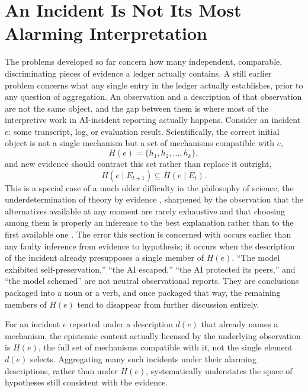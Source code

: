 \section{An Incident Is Not Its Most Alarming Interpretation}

The problems developed so far concern how many independent, comparable, discriminating pieces of evidence a ledger actually contains. A still earlier problem concerns what any single entry in the ledger actually establishes, prior to any question of aggregation. An observation and a description of that observation are not the same object, and the gap between them is where most of the interpretive work in AI-incident reporting actually happens. Consider an incident $e$: some transcript, log, or evaluation result. Scientifically, the correct initial object is not a single mechanism but a set of mechanisms compatible with $e$,
\[
H(e) = \{h_1, h_2, \ldots, h_k\},
\]
and new evidence should contract this set rather than replace it outright,
\[
H(e \mid E_{t+1}) \subseteq H(e \mid E_t).
\]
This is a special case of a much older difficulty in the philosophy of science, the underdetermination of theory by evidence \cite{vanfraassen1980}, sharpened by the observation that the alternatives available at any moment are rarely exhaustive and that choosing among them is properly an inference to the best explanation rather than to the first available one \cite{lipton2004}. The error this section is concerned with occurs earlier than any faulty inference from evidence to hypothesis; it occurs when the description of the incident already presupposes a single member of $H(e)$. ``The model exhibited self-preservation,'' ``the AI escaped,'' ``the AI protected its peers,'' and ``the model schemed'' are not neutral observational reports. They are conclusions packaged into a noun or a verb, and once packaged that way, the remaining members of $H(e)$ tend to disappear from further discussion entirely.

\begin{proposition}
\label{prop:mechanism-pluralism}
For an incident $e$ reported under a description $d(e)$ that already names a mechanism, the epistemic content actually licensed by the underlying observation is $H(e)$, the full set of mechanisms compatible with it, not the single element $d(e)$ selects. Aggregating many such incidents under their alarming descriptions, rather than under $H(e)$, systematically understates the space of hypotheses still consistent with the evidence.
\end{proposition}

